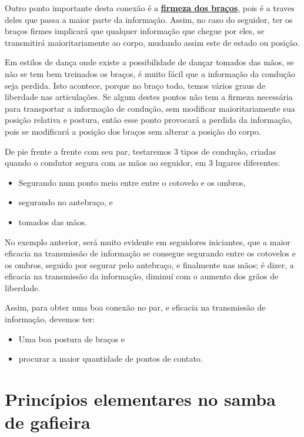 \begin{description}
Outro ponto importante desta conexão é a \hyperref[def:brazosfirmes]{\textbf{firmeza dos braços}}, 
pois é a traves deles que passa a maior parte da informação.
Assim, no caso do seguidor, ter os braços firmes implicará que qualquer informação que chegue por eles,
se transmitirá maioritariamente ao corpo,
mudando assim este de estado ou posição.

Em estilos de dança onde existe a possibilidade de dançar tomados das mãos,
se não se tem bem treinados os braços,
é muito fácil que a informação da condução seja perdida.
Isto acontece, porque no braço todo, temos vários graus de liberdade nas articulações.
Se algum destes pontos não tem a firmeza necessária para transportar a informação de condução, 
sem modificar maioritariamente sua posição relativa e postura,  
então esse ponto provocará a perdida da informação, 
pois se modificará a posição dos braços sem alterar a posição do corpo.
\begin{example}
De pie frente a frente com seu par, testaremos 3 tipos de condução, 
criadas quando o condutor segura com as mãos ao seguidor, em 3 lugares diferentes:
\begin{itemize}
\item Segurando num ponto meio entre entre o cotovelo e os ombros,
\item segurando no antebraço, e
\item tomados das mãos.
\end{itemize}
\end{example}
No exemplo anterior, será muito evidente em seguidores iniciantes,
que a maior eficacia na transmissão de informação se consegue segurando entre os cotovelos e os ombros,
seguido por segurar pelo antebraço, e finalmente nas mãos;
é dizer, a eficacia na transmissão da informação, 
diminuí com o aumento dos grãos de liberdade.

Assim, para obter uma boa conexão no par, 
e eficacia na transmissão de informação, devemos ter:
\begin{itemize}
\item Uma boa postura de braços e
\item procurar a maior quantidade de pontos de contato.
\end{itemize}  

\end{description}

\section{Princípios elementares no samba de gafieira}
\label{sec:principiosambagafieira}

